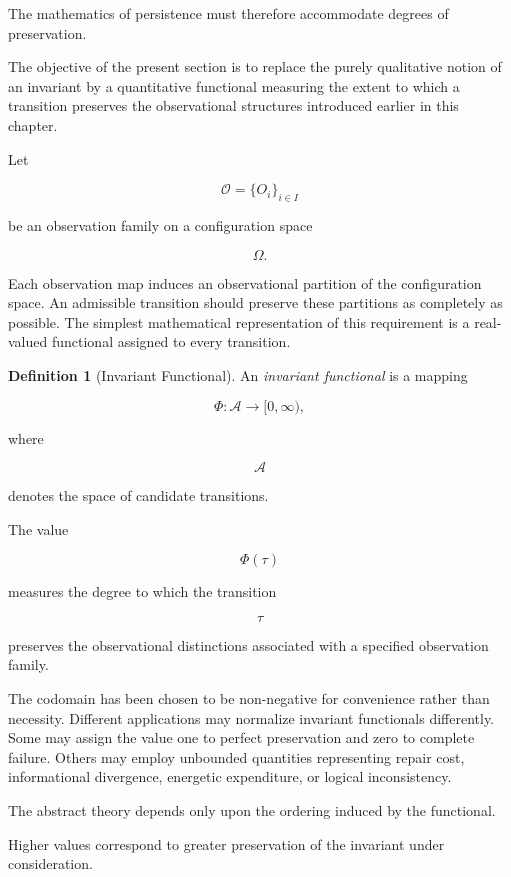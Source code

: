 \documentclass[11pt]{book}
\numberwithin{equation}{chapter}
\theoremstyle{definition}
\newtheorem{definition}{Definition}[chapter]
\theoremstyle{plain}
\begin{document}
The mathematics of persistence must therefore accommodate degrees of preservation.

The objective of the present section is to replace the purely qualitative notion of an invariant by a quantitative functional measuring the extent to which a transition preserves the observational structures introduced earlier in this chapter.

Let

\[
\mathcal{O}
=
\{O_i\}_{i\in I}
\]

be an observation family on a configuration space

\[
\Omega.
\]

Each observation map induces an observational partition of the configuration space. An admissible transition should preserve these partitions as completely as possible. The simplest mathematical representation of this requirement is a real-valued functional assigned to every transition.

\begin{definition}[Invariant Functional]

An \emph{invariant functional} is a mapping

\[
\Phi:\mathcal{A}\rightarrow[0,\infty),
\]

where

\[
\mathcal A
\]

denotes the space of candidate transitions.

The value

\[
\Phi(\tau)
\]

measures the degree to which the transition

\[
\tau
\]

preserves the observational distinctions associated with a specified observation family.

\end{definition}

The codomain has been chosen to be non-negative for convenience rather than necessity. Different applications may normalize invariant functionals differently. Some may assign the value one to perfect preservation and zero to complete failure. Others may employ unbounded quantities representing repair cost, informational divergence, energetic expenditure, or logical inconsistency.

The abstract theory depends only upon the ordering induced by the functional.

Higher values correspond to greater preservation of the invariant under consideration.
\end{document}
